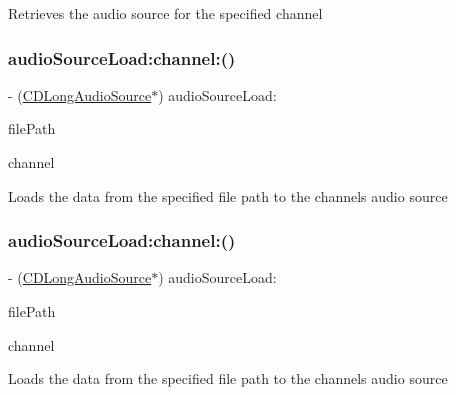 Retrieves the audio source for the specified channel \mbox{\label{interfaceCDAudioManager_a34c37890b0e9b8995230d1bdc9afa5a7}} 
\subsubsection{\texorpdfstring{audio\+Source\+Load\+:channel\+:()}{audioSourceLoad:channel:()}\hspace{0.1cm}{\footnotesize\ttfamily [1/4]}}
{\footnotesize\ttfamily -\/ (\hyperlink{interfaceCDLongAudioSource}{C\+D\+Long\+Audio\+Source}$\ast$) audio\+Source\+Load\+: \begin{DoxyParamCaption}\item[{(N\+S\+String $\ast$)}]{file\+Path }\item[{channel:(t\+Audio\+Source\+Channel)}]{channel }\end{DoxyParamCaption}}

Loads the data from the specified file path to the channel\textquotesingle{}s audio source \mbox{\label{interfaceCDAudioManager_a34c37890b0e9b8995230d1bdc9afa5a7}} 
\subsubsection{\texorpdfstring{audio\+Source\+Load\+:channel\+:()}{audioSourceLoad:channel:()}\hspace{0.1cm}{\footnotesize\ttfamily [2/4]}}
{\footnotesize\ttfamily -\/ (\hyperlink{interfaceCDLongAudioSource}{C\+D\+Long\+Audio\+Source}$\ast$) audio\+Source\+Load\+: \begin{DoxyParamCaption}\item[{(N\+S\+String $\ast$)}]{file\+Path }\item[{channel:(t\+Audio\+Source\+Channel)}]{channel }\end{DoxyParamCaption}}

Loads the data from the specified file path to the channel\textquotesingle{}s audio source \mbox{\label{interfaceCDAudioManager_a34c37890b0e9b8995230d1bdc9afa5a7}} 
